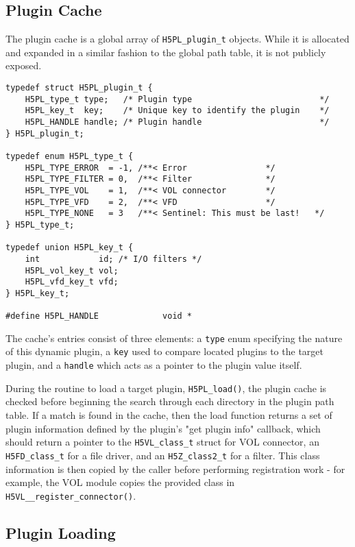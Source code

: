 \subsection{Plugin Cache}

The plugin cache is a global array of \texttt{H5PL\_plugin\_t} objects. While it is allocated and expanded in a similar fashion to the global path table, it is not publicly exposed.

\begin{verbatim}
typedef struct H5PL_plugin_t {
    H5PL_type_t type;   /* Plugin type                          */
    H5PL_key_t  key;    /* Unique key to identify the plugin    */
    H5PL_HANDLE handle; /* Plugin handle                        */
} H5PL_plugin_t;

typedef enum H5PL_type_t {
    H5PL_TYPE_ERROR  = -1, /**< Error                */
    H5PL_TYPE_FILTER = 0,  /**< Filter               */
    H5PL_TYPE_VOL    = 1,  /**< VOL connector        */
    H5PL_TYPE_VFD    = 2,  /**< VFD                  */
    H5PL_TYPE_NONE   = 3   /**< Sentinel: This must be last!   */
} H5PL_type_t;

typedef union H5PL_key_t {
    int            id; /* I/O filters */
    H5PL_vol_key_t vol;
    H5PL_vfd_key_t vfd;
} H5PL_key_t;

#define H5PL_HANDLE             void *
\end{verbatim}

The cache's entries consist of three elements: a \texttt{type} enum specifying the nature of this dynamic plugin, a \texttt{key} used to compare located plugins to the target plugin, and a \texttt{handle} which acts as a pointer to the plugin value itself.

During the routine to load a target plugin, \texttt{H5PL\_load()}, the plugin cache is checked before beginning the search through each directory in the plugin path table. If a match is found in the cache, then the load function returns a set of plugin information defined by the plugin's "get plugin info" callback, which should return a pointer to the \texttt{H5VL\_class\_t} struct for  VOL connector, an \texttt{H5FD\_class\_t} for a file driver, and an \texttt{H5Z\_class2\_t} for a filter. This class information is then copied by the caller before performing registration work - for example, the VOL module copies the provided class in \texttt{H5VL\_\_register\_connector()}.

\subsection{Plugin Loading}

